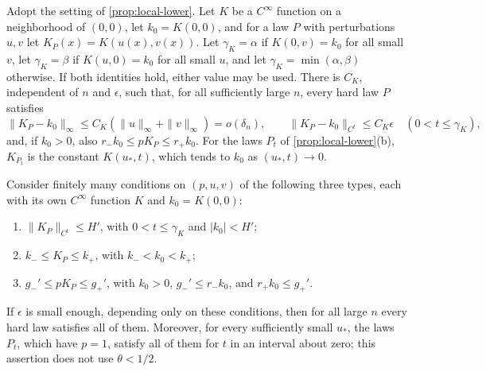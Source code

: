 \begin{lemma}
\label{lem:local}\label{cor:membership}
Adopt the setting of \cref{prop:local-lower}. Let $K$ be a
$C^\infty$ function on a neighborhood of $(0,0)$, let $k_0=K(0,0)$, and
for a law $P$ with perturbations $u,v$ let $K_P(x)=K(u(x),v(x))$.
Let $\gamma_K=\alpha$ if $K(0,v)=k_0$ for all small $v$, let
$\gamma_K=\beta$ if $K(u,0)=k_0$ for all small $u$, and let
$\gamma_K=\min(\alpha,\beta)$ otherwise. If both identities hold,
either value may be used. There is $C_K$, independent of $n$ and
$\epsilon$, such that, for all sufficiently large $n$, every hard law
$P$ satisfies
\[
 \|K_P-k_0\|_\infty
 \le C_K(\|u\|_\infty+\|v\|_\infty)=o(\delta_n),\qquad
\|K_P-k_0\|_{C^t}\le C_K\epsilon\quad(0<t\le\gamma_K),
\]
and, if $k_0>0$, also $r_-k_0\le pK_P\le r_+k_0$. For the laws $P_t$
of \cref{prop:local-lower}(b), $K_{P_t}$ is the constant
$K(u_*,t)$, which tends to $k_0$ as $(u_*,t)\to0$.

Consider finitely many conditions on $(p,u,v)$ of the following three
types, each with its own $C^\infty$ function $K$ and $k_0=K(0,0)$:
\begin{enumerate}
\item[(H)] $\|K_P\|_{C^t}\le H'$, with $0<t\le\gamma_K$ and $|k_0|<H'$;
\item[(I)] $k_-\le K_P\le k_+$, with $k_-<k_0<k_+$;
\item[(W)] $g_-'\le pK_P\le g_+'$, with $k_0>0$,
$g_-'\le r_-k_0$, and $r_+k_0\le g_+'$.
\end{enumerate}
If $\epsilon$ is small enough, depending only on these conditions, then
for all large $n$ every hard law satisfies all of them. Moreover, for
every sufficiently small $u_*$, the laws $P_t$, which have $p=1$,
satisfy all of them for $t$ in an interval about zero; this assertion
does not use $\theta<1/2$.
\end{lemma}

